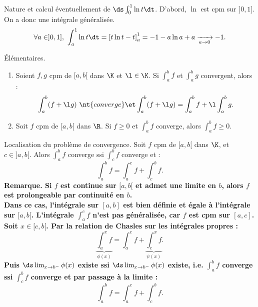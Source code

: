 \documentclass[11pt]{article}
\begin{document}
\begin{ex}{}{}
    Nature et calcul éventuellement de $\ds\int_0^1\ln t\dt$.
    \tcblower
    D'abord, $\ln$ est cpm sur $]0,1]$. On a donc une intégrale généralisée.
    \begin{equation*}
        \forall a \in ]0,1], ~ \int_a^1\ln t\dt = \left[ t\ln t - t \right]_a^1 = -1-a\ln a + a \xrightarrow[a\to0]{} -1.
    \end{equation*}
\end{ex}

\vspace*{-0.7cm}

\begin{prop}{Élémentaires.}{}
    \begin{enumerate}
        \item Soient $f,g$ cpm de $[a,b[$ dans $\K$ et $\l\in\K$. Si $\int_a^bf$ et $\int_a^bg$ convergent, alors :
        \begin{equation*}
            \int_a^b(f+\l g) ~\nt{converge} \et \int_a^b(f+\l g) = \int_a^b f + \l\int_a^bg.
        \end{equation*}
        \item Soit $f$ cpm de $[a,b[$ dans $\R$. Si $f\geq0$ et $\int_a^b f$ converge, alors $\int_a^b f\geq0$.
    \end{enumerate}
\end{prop}

\vspace*{-0.7cm}

\begin{prop}{Localisation du problème de convergence.}{}
    Soit $f$ cpm de $[a,b[$ dans $\K$, et $c\in]a,b[$. Alors $\int_a^b f$ converge ssi $\int_c^b f$ converge et :
    \begin{equation*}
        \int_a^b f = \int_a^c f + \int_c^b f.
    \end{equation*} 
    \bf{Remarque.} Si $f$ est continue sur $[a,b[$ et admet une limite en $b$, alors $f$ est prolongeable par continuité en $b$.\\
    Dans ce cas, l'intégrale sur $[a,b]$ est bien définie et égale à l'intégrale sur $[a,b[$.
    \tcblower
    L'intégrale $\int_a^cf$ n'est pas généralisée, car $f$ est cpm sur $[a,c]$.\\
    Soit $x\in[c,b[$. Par la relation de Chasles sur les intégrales propres :
    \begin{equation*}
        \underbrace{\int_a^x f}_{\phi(x)} = \int_a^c f + \underbrace{\int_c^x f}_{\psi(x)}.
    \end{equation*}
    Puis $\ds\lim_{x\to b^{-}} \phi(x)$ existe ssi $\ds\lim_{x\to b^{-}}\phi(x)$ existe, i.e. $\int_a^b f$ converge ssi $\int_c^b f$ converge et par passage à la limite : \vspace*{-0.1cm}
    \begin{equation*}
        \int_a^b f = \int_a^c f + \int_c^b f.
    \end{equation*}
\end{prop}
\end{document}
